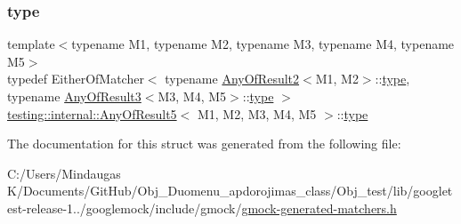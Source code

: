 \subsubsection{\texorpdfstring{type}{type}}
{\footnotesize\ttfamily template$<$typename M1, typename M2, typename M3, typename M4, typename M5$>$ \\
typedef Either\+Of\+Matcher$<$ typename \mbox{\hyperlink{structtesting_1_1internal_1_1_any_of_result2}{Any\+Of\+Result2}}$<$M1, M2$>$\+::\mbox{\hyperlink{structtesting_1_1internal_1_1_any_of_result5_a459a06dc5791313dce942668714f0c99}{type}}, typename \mbox{\hyperlink{structtesting_1_1internal_1_1_any_of_result3}{Any\+Of\+Result3}}$<$M3, M4, M5$>$\+::\mbox{\hyperlink{structtesting_1_1internal_1_1_any_of_result5_a459a06dc5791313dce942668714f0c99}{type}} $>$ \mbox{\hyperlink{structtesting_1_1internal_1_1_any_of_result5}{testing\+::internal\+::\+Any\+Of\+Result5}}$<$ M1, M2, M3, M4, M5 $>$\+::\mbox{\hyperlink{structtesting_1_1internal_1_1_any_of_result5_a459a06dc5791313dce942668714f0c99}{type}}}



The documentation for this struct was generated from the following file\+:\begin{DoxyCompactItemize}
\item 
C\+:/\+Users/\+Mindaugas K/\+Documents/\+Git\+Hub/\+Obj\+\_\+\+Duomenu\+\_\+apdorojimas\+\_\+class/\+Obj\+\_\+test/lib/googletest-\/release-\/1../googlemock/include/gmock/\mbox{\hyperlink{_obj__test_2lib_2googletest-release-1_88_81_2googlemock_2include_2gmock_2gmock-generated-matchers_8h}{gmock-\/generated-\/matchers.\+h}}\end{DoxyCompactItemize}
